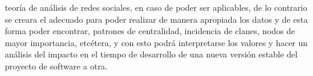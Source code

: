 \documentclass[12pt]{report}
\begin{document}
teoría de análisis de redes sociales, en caso de poder ser aplicables,
de lo  contrario se creara el  adecuado para poder realizar  de manera
apropiada  los datos  y de  esta  forma poder  encontrar, patrones  de
centralidad,  incidencia  de  clanes,   nodos  de  mayor  importancia,
etcétera,  y con  esto  podrá  interpretarse los  valores  y hacer  un
análisis del impacto  en el tiempo de desarrollo de  una nueva versión
estable del proyecto de software a otra.
\begin{comment}
Yo plantearia que es Debian, como funciona una distro a grandes rasgos
cuales son sus características que lo hacen un proyecto comunitario
orgánico, como se dan las conexiones, -i.e. todo lo que pusiste 
despues de hablar de SNA- y ya con esa información informar al lector 
que por tal motivo se usara SNA.

De nuevo también te recomiendo revisar y alternar conectores en todo
el texto.
\end{comment}
\end{document}

